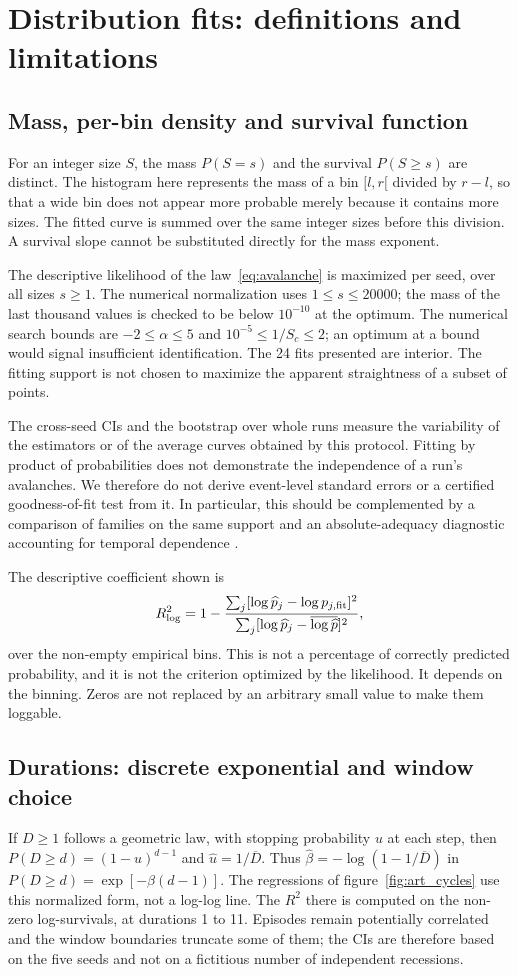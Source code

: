 \section{Distribution fits: definitions and limitations}\label{sec:ajustements}
\subsection{Mass, per-bin density and survival function}
For an integer size $S$, the mass $P(S=s)$ and the survival
$P(S\ge s)$ are distinct. The histogram here represents the mass
of a bin $[l,r[$ divided by $r-l$, so that a wide bin does not
appear more probable merely because it contains more
sizes. The fitted curve is summed over the same integer sizes
before this division. A survival slope cannot be
substituted directly for the mass exponent.

The descriptive likelihood of the law~\eqref{eq:avalanche} is maximized
per seed, over all sizes $s\ge1$. The numerical normalization
uses $1\le s\le20000$; the mass of the last thousand values is
checked to be below $10^{-10}$ at the optimum. The numerical search
bounds are $-2\le\alpha\le5$ and
$10^{-5}\le1/S_c\le2$; an optimum at a bound would signal
insufficient identification. The 24 fits presented are interior.
The fitting support is not chosen to maximize the apparent
straightness of a subset of points.

The cross-seed CIs and the bootstrap over whole runs measure the
variability of the estimators or of the average curves obtained by this
protocol. Fitting by product of probabilities does not demonstrate
the independence of a run's avalanches. We therefore do not derive
event-level standard errors or a certified goodness-of-fit test from it.
In particular, this should be complemented by a comparison of families on
the same support and an absolute-adequacy diagnostic accounting
for temporal dependence \cite{clauset}.

The descriptive coefficient shown is
\[
 R^2_{\log}=1-
 \frac{\sum_j[\log\widehat p_j-\log p_{j,\rm fit}]^2}
      {\sum_j[\log\widehat p_j-\overline{\log\widehat p}]^2},
\]
over the non-empty empirical bins. This is not a percentage
of correctly predicted probability, and it is not the criterion
optimized by the likelihood. It depends on the binning. Zeros are
not replaced by an arbitrary small value to make them
loggable.

\subsection{Durations: discrete exponential and window choice}
If $D\ge1$ follows a geometric law, with stopping probability $u$ at
each step, then $P(D\ge d)=(1-u)^{d-1}$ and
$\widehat u=1/\overline D$. Thus
$\widehat\beta=-\log(1-1/\overline D)$ in
$P(D\ge d)=\exp[-\beta(d-1)]$.
The regressions of figure~\ref{fig:art_cycles} use this
normalized form, not a log-log line. The $R^2$ there is computed
on the non-zero log-survivals, at durations 1 to 11. Episodes remain
potentially correlated and the window boundaries truncate some
of them; the CIs are therefore based on the five seeds and not on
a fictitious number of independent recessions.

